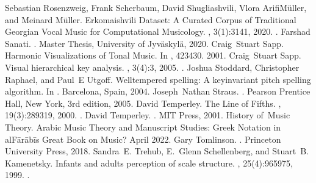 \documentclass[letterpaper,10pt,english]{sphinxmanual}
\begin{document}
\begin{sphinxthebibliography}{10}
\sphinxAtStartPar
Sebastian Rosenzweig, Frank Scherbaum, David Shugliashvili, Vlora Arifi\sphinxhyphen{}Müller, and Meinard Müller. Erkomaishvili Dataset: A Curated Corpus of Traditional Georgian Vocal Music for Computational Musicology. , 3(1):31\textendash{}41, 2020. .
\sphinxAtStartPar
Farshad Sanati. . Master Thesis, University of Jyväskylä, 2020.
\sphinxAtStartPar
Craig Stuart Sapp. Harmonic Visualizations of Tonal Music. In , 423\textendash{}430. 2001.
\sphinxAtStartPar
Craig Stuart Sapp. Visual hierarchical key analysis. , 3(4):3, 2005. .
\sphinxAtStartPar
Joshua Stoddard, Christopher Raphael, and Paul E Utgoff. Well\sphinxhyphen{}tempered spelling: A key\sphinxhyphen{}invariant pitch spelling algorithm. In . Barcelona, Spain, 2004.
\sphinxAtStartPar
Joseph Nathan Straus. . Pearson Prentice Hall, New York, 3rd edition, 2005.
\sphinxAtStartPar
David Temperley. The Line of Fifths. , 19(3):289\textendash{}319, 2000. .
\sphinxAtStartPar
David Temperley. . MIT Press, 2001.
\sphinxAtStartPar
History of Music Theory. Arabic Music Theory and Manuscript Studies: Greek Notation in al\sphinxhyphen{}Fārābī\textquotesingle{}s Great Book on Music? April 2022.
\sphinxAtStartPar
Gary Tomlinson. . Princeton University Press, 2018.
\sphinxAtStartPar
Sandra E. Trehub, E. Glenn Schellenberg, and Stuart B. Kamenetsky. Infants\textquotesingle{} and adults\textquotesingle{} perception of scale structure. , 25(4):965\textendash{}975, 1999. .

\end{sphinxthebibliography}
\end{document}
